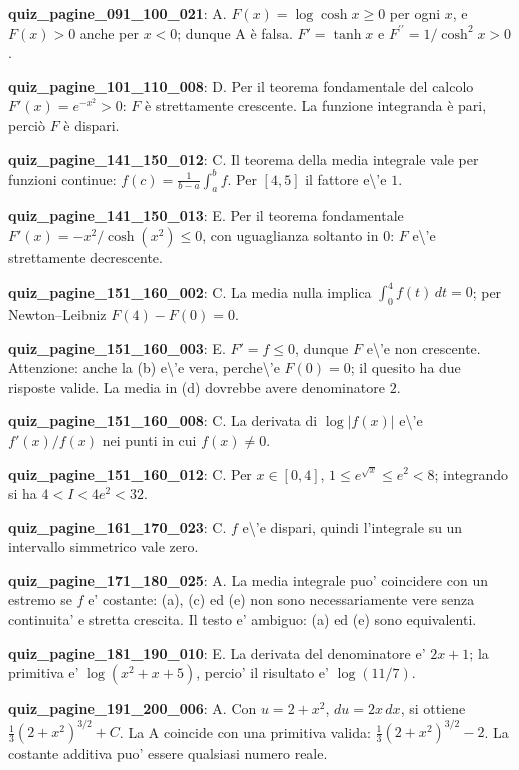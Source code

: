 \documentclass[11pt,a4paper]{article}
\newcounter{quiz}
\begin{document}
\noindent\textbf{quiz\_pagine\_091\_100\_021}: A. $F(x)=\log\cosh x\geq0$ per ogni $x$, e $F(x)>0$ anche per $x<0$; dunque A è falsa. $F\prime=\tanh x$ e $F^{\prime\prime}=1/\cosh^2x>0$.\par\medskip
\noindent\textbf{quiz\_pagine\_101\_110\_008}: D. Per il teorema fondamentale del calcolo $F\prime(x)=e^{-x^2}>0$: $F$ è strettamente crescente. La funzione integranda è pari, perciò $F$ è dispari.\par\medskip
\noindent\textbf{quiz\_pagine\_141\_150\_012}: C. Il teorema della media integrale vale per funzioni continue: $f(c)=\frac1{b-a}\int_a^b f$. Per $[4,5]$ il fattore e\textbackslash{}'e $1$.\par\medskip
\noindent\textbf{quiz\_pagine\_141\_150\_013}: E. Per il teorema fondamentale $F\prime(x)=-x^2/\cosh(x^2)\leq0$, con uguaglianza soltanto in $0$: $F$ e\textbackslash{}'e strettamente decrescente.\par\medskip
\noindent\textbf{quiz\_pagine\_151\_160\_002}: C. La media nulla implica $\int_0^4 f(t)\,dt=0$; per Newton--Leibniz $F(4)-F(0)=0$.\par\medskip
\noindent\textbf{quiz\_pagine\_151\_160\_003}: E. $F\prime=f\leq0$, dunque $F$ e\textbackslash{}'e non crescente. Attenzione: anche la (b) e\textbackslash{}'e vera, perche\textbackslash{}'e $F(0)=0$; il quesito ha due risposte valide. La media in (d) dovrebbe avere denominatore $2$.\par\medskip
\noindent\textbf{quiz\_pagine\_151\_160\_008}: C. La derivata di $\log|f(x)|$ e\textbackslash{}'e $f\prime(x)/f(x)$ nei punti in cui $f(x)\ne0$.\par\medskip
\noindent\textbf{quiz\_pagine\_151\_160\_012}: C. Per $x\in[0,4]$, $1\leq e^{\sqrt{x}}\leq e^2<8$; integrando si ha $4<I<4e^2<32$.\par\medskip
\noindent\textbf{quiz\_pagine\_161\_170\_023}: C. $f$ e\textbackslash{}'e dispari, quindi l'integrale su un intervallo simmetrico vale zero.\par\medskip
\noindent\textbf{quiz\_pagine\_171\_180\_025}: A. La media integrale puo' coincidere con un estremo se $f$ e' costante: (a), (c) ed (e) non sono necessariamente vere senza continuita' e stretta crescita. Il testo e' ambiguo: (a) ed (e) sono equivalenti.\par\medskip
\noindent\textbf{quiz\_pagine\_181\_190\_010}: E. La derivata del denominatore e' $2x+1$; la primitiva e' $\log(x^2+x+5)$, percio' il risultato e' $\log(11/7)$.\par\medskip
\noindent\textbf{quiz\_pagine\_191\_200\_006}: A. Con $u=2+x^2$, $du=2x\,dx$, si ottiene $\frac13(2+x^2)^{3/2}+C$. La A coincide con una primitiva valida: $\frac13(2+x^2)^{3/2}-2$. La costante additiva puo' essere qualsiasi numero reale.\par\medskip
\end{document}
